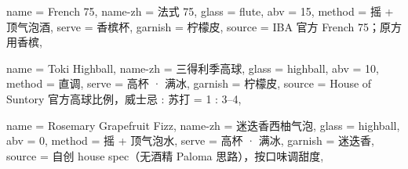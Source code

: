 \documentclass{cocktailcheatsheet}
\begin{document}
\begin{recipe}[half=r2]{
  name = French 75, name-zh = 法式 75, glass = flute, abv = 15,
  method = {摇 + 顶气泡酒}, serve = 香槟杯, garnish = 柠檬皮,
  source = {IBA 官方 French 75；原方用香槟},
}
\begin{ingredients}
\end{ingredients}
\end{recipe}\rowgap
\noindent
\begin{recipe}[half=r3]{
  name = Toki Highball, name-zh = 三得利季高球, glass = highball, abv = 10,
  method = 直调, serve = {高杯 · 满冰}, garnish = 柠檬皮,
  source = {House of Suntory 官方高球比例，威士忌 : 苏打 = 1 : 3–4},
}
\begin{ingredients}
\end{ingredients}
\end{recipe}\hfill
\begin{recipe}[half=r3]{
  name = Rosemary Grapefruit Fizz, name-zh = 迷迭香西柚气泡, glass = highball, abv = 0,
  method = {摇 + 顶气泡水}, serve = {高杯 · 满冰}, garnish = 迷迭香,
  source = {自创 house spec（无酒精 Paloma 思路），按口味调甜度},
}
\begin{ingredients}
\end{ingredients}
\end{recipe}\par
\end{document}
